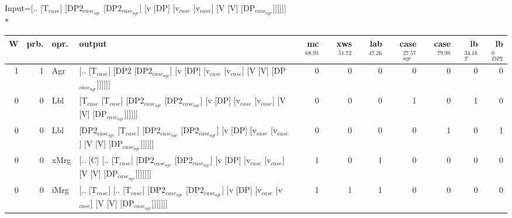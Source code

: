 \begingroup\scriptsize Input=[.. [T$_{case}$] [DP2$_{case_{agr}}$ [DP2$_{case_{agr}}$] [v [DP] [v$_{case}$ [v$_{case}$] [V [V] [DP$_{case_{agr}}$]]]]]]\\*
\begin{tabularx}{\linewidth}{rrlXrrrrrrr}
\hline
   W &   prb. & opr.   & output                                                                                                                                                                           &   mc$^{68.93}$ &   xws$^{51.72}$ &   lab$^{47.26}$ &   case$_{agr}^{27.57}$ &   case$^{79.98}$ &   lb$_{T}^{34.16}$ &   lb$_{DP2}^{0}$ \\
\hline
   1 &   1 & Agr  & [.. [T$_{case}$] [DP2 [DP2$_{case_{agr}}$] [v [DP] [v$_{case}$ [v$_{case}$] [V [V] [DP$_{case_{agr}}$]]]]]]                                                                                              &            0 &             0 &             0 &                  0 &              0 &              0 &            0 \\
   0 &   0 & Lbl  & [T$_{case}$ [T$_{case}$] [DP2$_{case_{agr}}$ [DP2$_{case_{agr}}$] [v [DP] [v$_{case}$ [v$_{case}$] [V [V] [DP$_{case_{agr}}$]]]]]]                                                                                 &            0 &             0 &             0 &                  1 &              0 &              1 &            0 \\
   0 &   0 & Lbl  & [DP2$_{case_{agr}}$ [T$_{case}$] [DP2$_{case_{agr}}$ [DP2$_{case_{agr}}$] [v [DP] [v$_{case}$ [v$_{case}$] [V [V] [DP$_{case_{agr}}$]]]]]]                                                                           &            0 &             0 &             0 &                  0 &              1 &              0 &            1 \\
   0 &   0 & xMrg & [.. [C] [.. [T$_{case}$] [DP2$_{case_{agr}}$ [DP2$_{case_{agr}}$] [v [DP] [v$_{case}$ [v$_{case}$] [V [V] [DP$_{case_{agr}}$]]]]]]]                                                                            &            1 &             0 &             1 &                  0 &              0 &              0 &            0 \\
   0 &   0 & iMrg & [.. [T$_{case}$] [.. [T$_{case}$] [DP2$_{case_{agr}}$ [DP2$_{case_{agr}}$] [v [DP] [v$_{case}$ [v$_{case}$] [V [V] [DP$_{case_{agr}}$]]]]]]]                                                                       &            1 &             1 &             1 &                  0 &              0 &              0 &            0 \\

\end{tabularx}
